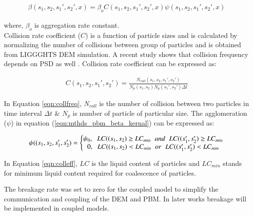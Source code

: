 \documentclass[preprint,11pt,authoryear]{elsarticle}
\begin{document}
\begin{align}
\beta(s_1,s_2,s_1',s_2',x) = \beta_oC(s_1,s_2,s_1',s_2',x)\psi(s_1,s_2,s_1',s_2',x)
\label{eqn:mthds_pbm_beta_kernal}
\end{align}

where, $\beta_o$ is aggregation rate constant.\\
Collision rate coefficient ($C$) is a function of particle sizes and is calculated by normalizing the
number of collisions between group of particles \citep{gantt2006} and is obtained from LIGGGHTS
DEM simulation. A recent study shows that collision frequency depends on PSD as well
\citep{sen2014}. Collision rate coefficient can be expressed as:

\begin{align}
C(s_1,s_2,s_1',s_2')=\frac{N_{coll}(s_1,s_2,s_1',s_2')}{N_p(s_1,s_2)N_p(s_1',s_2')\Delta t}
\label{eqn:collfreq}
\end{align}

In Equation \ref{eqn:collfreq}, $N_{coll}$ is the number of collision between two particles in
time interval $\Delta t$ \& $N_p$ is number of particle of particular size. The agglomeration
($\psi$) in equation (\ref{eqn:mthds_pbm_beta_kernal}) can be expressed as:

\begin{align}
\psi((s_1,s_2,s_1',s_2') = 
\left\{\begin{matrix}
\psi_0,\hspace{0.2cm} LC((s_1,s_2) \geq LC_{min}\hspace{0.2cm} and\hspace{0.2cm} LC((s_1',s_2') \geq LC_{min}   \\ 
0,\hspace{0.2cm} LC((s_1,s_2) < LC_{min}\hspace{0.2cm} or\hspace{0.2cm} LC((s_1',s_2') < LC_{min}
\end{matrix}\right.
\label{eqn:colleff}
\end{align}

In Equation \ref{eqn:colleff}, $LC$ is the liquid content of particles and $LC_{min}$ stands for minimum
 liquid content required for coalescence of particles.

The breakage rate was set to zero for the coupled model to simplify the communication and coupling of the DEM and PBM. In later works breakage will be implemented in coupled models.
\end{document}
